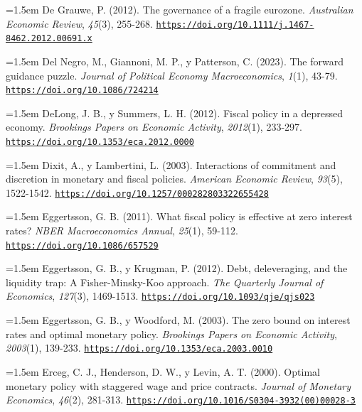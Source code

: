 \documentclass[10pt,a4paper]{article}
\begin{document}
\noindent\hangindent=1.5em De Grauwe, P. (2012). The governance of a fragile eurozone. \textit{Australian Economic Review}, \textit{45}(3), 255-268. \href{https://doi.org/10.1111/j.1467-8462.2012.00691.x}{\nolinkurl{https://doi.org/10.1111/j.1467-8462.2012.00691.x}}

\noindent\hangindent=1.5em Del Negro, M., Giannoni, M. P., y Patterson, C. (2023). The forward guidance puzzle. \textit{Journal of Political Economy Macroeconomics}, \textit{1}(1), 43-79. \href{https://doi.org/10.1086/724214}{\nolinkurl{https://doi.org/10.1086/724214}}

\noindent\hangindent=1.5em DeLong, J. B., y Summers, L. H. (2012). Fiscal policy in a depressed economy. \textit{Brookings Papers on Economic Activity}, \textit{2012}(1), 233-297. \href{https://doi.org/10.1353/eca.2012.0000}{\nolinkurl{https://doi.org/10.1353/eca.2012.0000}}

\noindent\hangindent=1.5em Dixit, A., y Lambertini, L. (2003). Interactions of commitment and discretion in monetary and fiscal policies. \textit{American Economic Review}, \textit{93}(5), 1522-1542. \href{https://doi.org/10.1257/000282803322655428}{\nolinkurl{https://doi.org/10.1257/000282803322655428}}

\noindent\hangindent=1.5em Eggertsson, G. B. (2011). What fiscal policy is effective at zero interest rates? \textit{NBER Macroeconomics Annual}, \textit{25}(1), 59-112. \href{https://doi.org/10.1086/657529}{\nolinkurl{https://doi.org/10.1086/657529}}

\noindent\hangindent=1.5em Eggertsson, G. B., y Krugman, P. (2012). Debt, deleveraging, and the liquidity trap: A Fisher-Minsky-Koo approach. \textit{The Quarterly Journal of Economics}, \textit{127}(3), 1469-1513. \href{https://doi.org/10.1093/qje/qjs023}{\nolinkurl{https://doi.org/10.1093/qje/qjs023}}

\noindent\hangindent=1.5em Eggertsson, G. B., y Woodford, M. (2003). The zero bound on interest rates and optimal monetary policy. \textit{Brookings Papers on Economic Activity}, \textit{2003}(1), 139-233. \href{https://doi.org/10.1353/eca.2003.0010}{\nolinkurl{https://doi.org/10.1353/eca.2003.0010}}

\noindent\hangindent=1.5em Erceg, C. J., Henderson, D. W., y Levin, A. T. (2000). Optimal monetary policy with staggered wage and price contracts. \textit{Journal of Monetary Economics}, \textit{46}(2), 281-313. \href{https://doi.org/10.1016/S0304-3932(00)00028-3}{\nolinkurl{https://doi.org/10.1016/S0304-3932(00)00028-3}}
\end{document}
